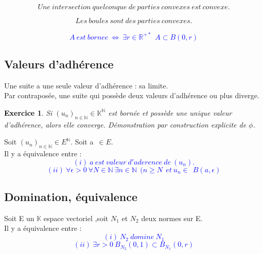\documentclass{article}
\begin{document}
\begin{theo}
\[Une\ intersection \ quelconque \ de\ parties\ convexes\ est\ convexe. \]
\end{theo}

\begin{theo}
\[Les\ boules\ sont\ des\ parties\ convexes. \]
\end{theo}

\begin{theo}
\textcolor{blue}{
\[A\ est\ bornee \ \Leftrightarrow \ \exists r \in \mathbb{R}^{+*} \ \ A \subset B(0,r) \]}

\end{theo}
\subsection{Valeurs d'adhérence }
\begin{theo}
Une suite a une seule valeur d'adhérence : sa limite. \\
Par contraposée, une suite qui possède deux valeurs d'adhérence ou plus diverge.

\end{theo}

\newtheorem{exo} {\textcolor{black}{ Exercice }}[subsection]
\newtheorem{defi} {\textcolor{green}{ Définition }}[subsection]

\begin{exo}
Si $(u_{n})_{n \in \mathbb{N}} \in\mathbb{K}^{\mathbb{N}}$  est bornée et possède une unique valeur d'adhérence, alors elle converge.
Démonstration par construction explicite de $\phi$.

\end{exo}


\begin{theo}
Soit $(u_{n})_{n \in \mathbb{N}} \in{E}^{\mathbb{N}}$.
Soit a\ $\in{E}$.\\
Il y a équivalence entre :
\textcolor{blue}{
\[ (i)\ a\ est\ valeur\ d'aderence\ de\ (u_{n}). \]
\[(ii)\ \forall \epsilon>0 \ \forall N \in \mathbb{N} \ \exists n \in \mathbb{N}\ \ (n\geq N\ \ et\ u_{n}\in\ \ B(a,\epsilon)\]}

\end{theo}
\subsection{Domination, équivalence }
\begin{theo}
Soit E un $\mathbb{K}$ espace vectoriel ,soit $ N_{1}$ et $N_{2}$ deux normes sur E.\\
Il y a équivalence entre :
\textcolor{blue}{
\[(i) \  N_{2} \  domine \  N_{1}\]
\[(ii) \ \exists r>0 \ B_{N_{2}}(0,1)\subset B_{N_{1}}(0,r)\]}

\end{theo}
\end{document}
